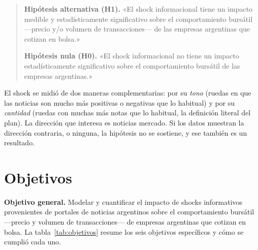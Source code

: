 \begin{quote}
\textbf{Hipótesis alternativa (H1).} «El shock informacional tiene un impacto medible y
estadísticamente significativo sobre el comportamiento bursátil —precio y/o volumen de
transacciones— de las empresas argentinas que cotizan en bolsa.»

\textbf{Hipótesis nula (H0).} «El shock informacional no tiene un impacto estadísticamente
significativo sobre el comportamiento bursátil de las empresas argentinas.»
\end{quote}

El shock se midió de dos maneras complementarias: por su \textit{tono} (ruedas en que las
noticias son mucho más positivas o negativas que lo habitual) y por su \textit{cantidad}
(ruedas con muchas más notas que lo habitual, la definición literal del plan). La dirección que
interesa es noticias \flecha{} mercado. Si los datos muestran la dirección contraria, o
ninguna, la hipótesis no se sostiene, y ese también es un resultado.

\section{Objetivos}

\textbf{Objetivo general.} Modelar y cuantificar el impacto de shocks informativos
provenientes de portales de noticias argentinos sobre el comportamiento bursátil —precio y
volumen de transacciones— de empresas argentinas que cotizan en bolsa. La
tabla~\ref{tab:objetivos} resume los seis objetivos específicos y cómo se cumplió cada uno.

